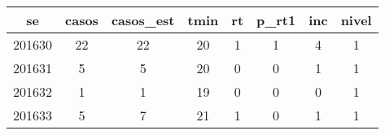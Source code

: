 \begin{tabular}{c|ccccccc}
  \hline
se & casos & casos\_est & tmin & rt & p\_rt1 & inc & nivel \\ 
  \hline
201630 & 22 & 22 & 20 & 1 & 1 & 4 & 1 \\ 
  201631 & 5 & 5 & 20 & 0 & 0 & 1 & 1 \\ 
  201632 & 1 & 1 & 19 & 0 & 0 & 0 & 1 \\ 
  201633 & 5 & 7 & 21 & 1 & 0 & 1 & 1 \\ 
   \hline
\end{tabular}
